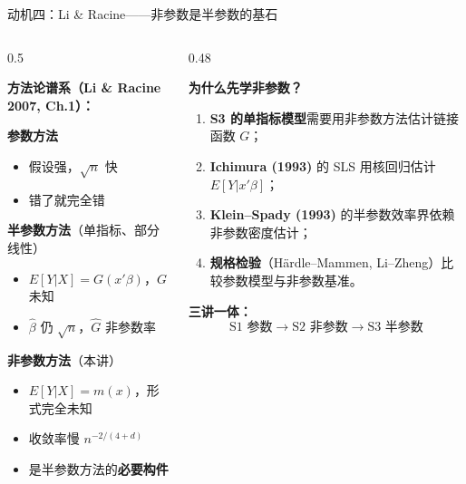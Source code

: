 \documentclass[aspectratio=169, 10pt]{beamer}
\begin{document}
\begin{frame}{动机四：Li \& Racine——非参数是半参数的基石}

  \begin{columns}[T]
    \begin{column}{0.5\textwidth}
      \begin{keybox}
        \textbf{方法论谱系（Li \& Racine 2007, Ch.1）：}

        \vspace{0.3em}
        \textbf{参数方法}
        \begin{itemize}\footnotesize
          \item 假设强，$\sqrt{n}$ 快
          \item 错了就完全错
        \end{itemize}

        \vspace{0.3em}
        \textbf{半参数方法}（单指标、部分线性）
        \begin{itemize}\footnotesize
          \item $E[Y|X]=G(x'\beta)$，$G$ 未知
          \item $\hat\beta$ 仍 $\sqrt{n}$，$\hat G$ 非参数率
        \end{itemize}

        \vspace{0.3em}
        \textbf{非参数方法}（本讲）
        \begin{itemize}\footnotesize
          \item $E[Y|X]=m(x)$，形式完全未知
          \item 收敛率慢 $n^{-2/(4+d)}$
          \item 是半参数方法的\textbf{必要构件}
        \end{itemize}
      \end{keybox}
    \end{column}
    \begin{column}{0.48\textwidth}
      \begin{highlightbox}
        \textbf{为什么先学非参数？}
        \begin{enumerate}
          \item \textbf{S3 的单指标模型}需要用非参数方法估计链接函数 $G$；
          \item \textbf{Ichimura (1993)} 的 SLS 用核回归估计 $E[Y|x'\beta]$；
          \item \textbf{Klein--Spady (1993)} 的半参数效率界依赖非参数密度估计；
          \item \textbf{规格检验}（Härdle--Mammen, Li--Zheng）比较参数模型与非参数基准。
        \end{enumerate}

        \vspace{0.3em}
        \textbf{三讲一体：}
        \[
          \text{S1 参数} \longrightarrow \text{S2 非参数} \longrightarrow \text{S3 半参数}
        \]
      \end{highlightbox}
    \end{column}
  \end{columns}

\end{frame}
\end{document}
